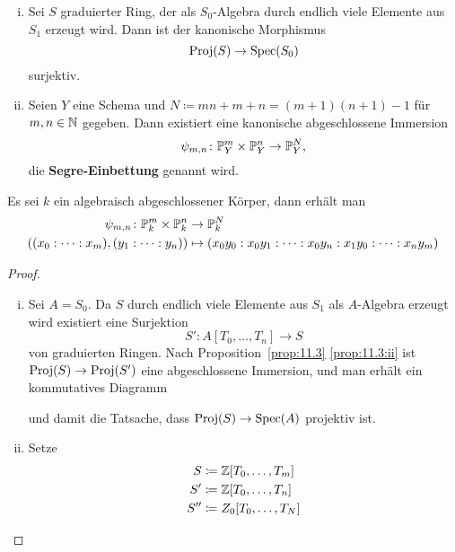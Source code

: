 \begin{kor}
	\label{kor:11.4}
	\begin{enumerate}[i)]
		\item\label{kor:11.4:i} Sei $S$ graduierter Ring, der als $S_0$-Algebra durch endlich viele Elemente aus $S_1$ erzeugt wird. Dann ist der kanonische Morphismus
			\[
				\Proj(S) \to \Spec(S_0)
			\]
			surjektiv.
		\item\label{kor:11.4:ii} Seien $Y$ eine Schema und $N \coloneqq mn + m + n = (m+1)(n+1)-1$ für $m,n \in \N$ gegeben. Dann existiert eine kanonische abgeschlossene Immersion
			\[
				\psi_{m,n} \colon \P_Y^m \times \P_Y^n \to \P_Y^N,
			\]
			die \textbf{Segre-Einbettung} genannt wird.
	\end{enumerate}
	\begin{bsp*} Es sei $k$ ein algebraisch abgeschlossener Körper, dann erhält man
		\begin{align*}
			\psi_{m,n} \colon \P_k^m \times \P_k^n &\to \P_k^N \\
			((x_0 : \dotsm : x_m),(y_1:\dotsm:y_n)) &\mapsto (x_0 y_0 : x_0 y_1 : \dotsm : x_0 y_n: x_1 y_0 : \dotsm : x_n y_m)
		\end{align*}    
	\end{bsp*}
	\begin{proof}
		\begin{enumerate}[i)]
		\item Sei $A =S_0$. Da $S$ durch endlich viele Elemente aus $S_1$ als $A$-Algebra erzeugt wird existiert eine Surjektion
			\[
				S' \colon A[T_0,\dotsc,T_n] \to S
			\]
			von graduierten Ringen. Nach Proposition~\ref{prop:11.3} \ref{prop:11.3:ii} ist $\Proj(S) \to \Proj(S')$ eine abgeschlossene Immersion, und man erhält ein kommutatives Diagramm
			\begin{center}
			\end{center}
			und damit die Tatsache, dass $\Proj(S) \to \Spec(A)$ projektiv ist.
		\item
			Setze 
			\begin{align*}
				S &\coloneqq \Z[T_0,\dotsc,T_m]\\
				S' &\coloneqq \Z[T_0,\dotsc, T_n]\\
				S'' &\coloneqq Z_0 [ T_0,\dotsc,T_N ]\\

\end{align*}
\end{enumerate}
\end{proof}
\end{kor}
